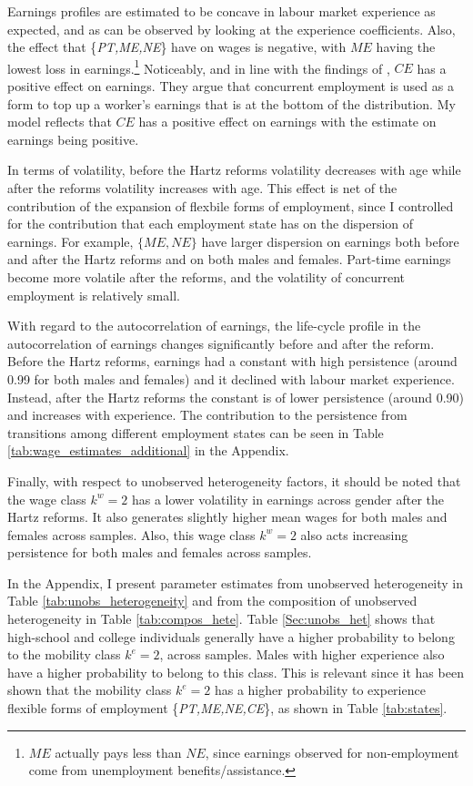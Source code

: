 \documentclass[12pt, a4paper]{article}
\begin{document}
Earnings profiles are estimated to be concave in labour market experience as expected, and as can be observed by looking at the experience coefficients. Also, the effect that \{\emph{PT,ME,NE}\} have on wages is negative, with $ME$ having the lowest loss in earnings.\footnote{$ME$ actually pays less than $NE$, since earnings observed for non-employment come from unemployment benefits/assistance.} Noticeably, and in line with the findings of \cite{CaLaRo18}, $CE$ has a positive effect on earnings. They argue that concurrent employment is used as a form to top up a worker's earnings that is at the bottom of the distribution. My model reflects that $CE$ has a positive effect on earnings with the estimate on earnings being positive.

In terms of volatility, before the Hartz reforms volatility decreases with age while after the reforms volatility increases with age. This effect is net of the contribution of the expansion of flexbile forms of employment, since I controlled for the contribution that each employment state has on the dispersion of earnings. For example, $\{ME,NE\}$ have larger dispersion on earnings both before and after the Hartz reforms and on both males and females. Part-time earnings become more volatile after the reforms, and the volatility of concurrent employment is relatively small.

With regard to the autocorrelation of earnings, the life-cycle profile in the autocorrelation of earnings changes significantly before and after the reform. Before the Hartz reforms, earnings had a constant with high persistence (around 0.99 for both males and females) and it declined with labour market experience. Instead, after the Hartz reforms the constant is of lower persistence (around 0.90) and increases with experience. The contribution to the persistence from transitions among different employment states can be seen in Table \ref{tab:wage_estimates_additional} in the Appendix.

Finally, with respect to unobserved heterogeneity factors, it should be noted that the wage class $k^w=2$ has a lower volatility in earnings across gender after the Hartz reforms. It also generates slightly higher mean wages for both males and females across samples. Also, this wage class $k^w=2$ also acts increasing persistence for both males and females across samples.

In the Appendix, I present parameter estimates from unobserved heterogeneity in Table \ref{tab:unobs_heterogeneity} and from the composition of unobserved heterogeneity in Table \ref{tab:compos_hete}. Table \ref{Sec:unobs_het} shows that high-school and college individuals generally have a higher probability to belong to the mobility class $k^e=2$, across samples. Males with higher experience also have a higher probability to belong to this class. This is relevant since it has been shown that the mobility class $k^e=2$ has a higher probability to experience flexible forms of employment \{\emph{PT,ME,NE,CE}\}, as shown in Table \ref{tab:states}. 
\end{document}
